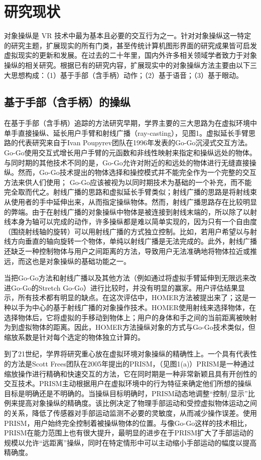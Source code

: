 \chapter{研究现状}

对象操纵是 VR 技术中最为基本且必要的交互行为之一。针对对象操纵这一特定的研究主题，扩展现实的所有门类，甚至传统计算机图形界面的研究成果皆可启发虚拟现实的更新和发展。在过去的二十年里，国内外许多相关领域学者致力于对象操纵的相关研究。根据已有的研究内容，扩展现实中的对象操纵方法主要由以下三大思想构成：（1）基于手部（含手柄）动作；（2）基于语音；（3）基于眼动。

\section{基于手部（含手柄）的操纵}

在基于手部（含手柄）追踪的方法研究早期，学界主要的三大思路为在虚拟环境中单手直接操纵、延长用户手臂和射线广播（ray-casting），见图1。虚拟延长手臂思路的代表研究来自于Ivan Poupyrev团队在1996年发表的Go-Go沉浸式交互方法。Go-Go使用交互式增长用户手臂的元函数和非线性映射来指定和操纵远处的物体。与同时期的其他技术不同的是，Go-Go允许对附近的和远处的物体进行无缝直接操纵。然而，Go-Go技术提出的物体选择和操控模式并不能完全作为一个完整的交互方法来供人们使用； Go-Go应该被视为以同时期技术为基础的一个补充，而不能完全取而代之。射线广播的思路和虚拟延长手臂类似；射线广播的思路是将射线束从使用者的手中延伸出来，从而指定操纵物体。然而，射线广播思路存在比较明显的弊端。由于在射线广播的对象操纵中物体是被连接到射线末端的，所以除了以射线本身为轴可以完成的动作，许多操纵都是难以简单实现的，因为只有一个自由度（围绕射线轴的旋转）可以用射线广播的方式独立控制。比如，若用户希望以与射线方向垂直的轴向旋转一个物体，单纯以射线广播是无法完成的。此外，射线广播还缺乏一种控制物体与用户之间距离的方法，导致用户无法准确地将物体拉近或推远，而这也是对象操纵的基础功能之一。

当把Go-Go方法和射线广播以及其他方法（例如通过将虚拟手臂延伸到无限远来改进Go-Go的Stretch Go-Go）进行比较时，并没有明显的赢家。用户评估结果显示，所有技术都有明显的缺点。在这次评估中，HOMER方法被提出来了；这是一种以手为中心的基于射线广播的对象操作技术。HOMER使用射线来选择物体，在选择物体后，它将虚拟的手移动到物体上；用户的身体和手之间的当前距离被映射为到虚拟物体的距离。因此，HOMER方法操纵对象的方式与Go-Go技术类似，但缩放系数是针对每个选定的物体独立计算的。

到了21世纪，学界将研究重心放在虚拟环境对象操纵的精确性上。一个具有代表性的方法是Scott Frees团队在2005年提出的PRISM，（见图1(a)）PRISM是一种通过缩放操作进行精确和快速交互的方法，它在同时期是一种非常新颖且具有开创性的交互技术。PRISM主动根据用户在虚拟环境中的行为特征来确定他们所想的操纵目标是明确还是不明确的。当操纵目标明确时，PRISM动态地调整“控制/显示”比例来提高对象操纵的精确度。该比例决定了物理手部运动和受控虚拟物体运动之间的关系，降低了传感器对手部运动监测不必要的灵敏度，从而减少操作误差。使用PRISM，用户始终完全控制着被操纵物体的位置。与像Go-Go这样的技术相比，PRISM在能力范围上也有很大提升，最明显的进步在于PRISM扩大了手部运动的规模以允许“远距离”操纵，同时在特定情形中可以主动缩小手部运动的幅度以提高精确度。

